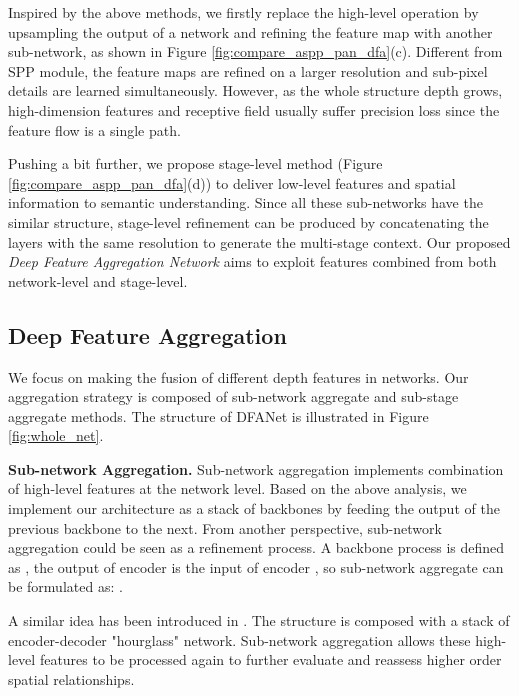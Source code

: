 \documentclass[10pt,twocolumn,letterpaper]{article}
\begin{document}
Inspired by the above methods, we firstly replace the high-level operation 
by upsampling the output of a network and refining the feature map with another sub-network, as shown in Figure \ref{fig:compare_aspp_pan_dfa}(c). Different from SPP module, the feature maps are refined on a larger resolution and sub-pixel details are learned simultaneously. 
However, as the whole structure depth grows, high-dimension features and receptive field usually suffer precision loss since the feature flow is a single path. 

Pushing a bit further, we propose stage-level method (Figure \ref{fig:compare_aspp_pan_dfa}(d)) to deliver low-level features and spatial information to semantic understanding. Since all these sub-networks have the similar structure, stage-level refinement can be produced by concatenating the layers with the same resolution to generate the multi-stage context. Our proposed \textit{Deep Feature Aggregation Network} aims to exploit features combined from both network-level and stage-level.













\subsection{Deep Feature Aggregation}

We focus on making the fusion of different depth features in networks. Our aggregation strategy is composed of sub-network aggregate and sub-stage aggregate methods. The structure of DFANet is illustrated in Figure \ref{fig:whole_net}.

\textbf{Sub-network Aggregation.} Sub-network aggregation implements combination of high-level features at the network level.
Based on the above analysis, we implement our architecture as a stack of backbones by feeding the output of the previous backbone to the next. From another perspective, sub-network aggregation could be seen as a refinement process. A backbone process is defined as , the output of encoder  is the input of encoder , so sub-network aggregate can be formulated as: .

A similar idea has been introduced in \cite{stack_hourglass}. The structure is composed with a stack of encoder-decoder "hourglass" network. Sub-network aggregation allows these high-level features to be processed again to further evaluate and reassess higher order spatial relationships.
\end{document}
